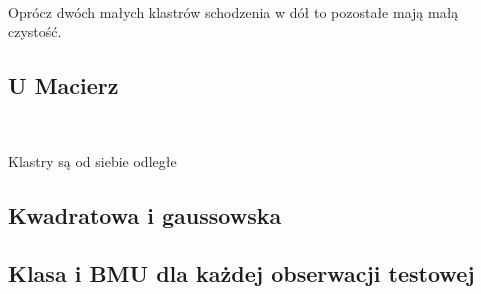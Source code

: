 \documentclass[11pt]{article}
\begin{document}
            
        
    \begin{center}
    \end{center}
    { \hspace*{\fill} \\}
    
    Oprócz dwóch małych klastrów schodzenia w dół to pozostałe mają małą
czystość.

    \hypertarget{u-macierz}{%
\subsection{U Macierz}\label{u-macierz}}

            
        
    \begin{center}
    \end{center}
    { \hspace*{\fill} \\}
    
    Klastry są od siebie odległe

    \hypertarget{kwadratowa-i-gaussowska}{%
\subsection{Kwadratowa i gaussowska}\label{kwadratowa-i-gaussowska}}

    \hypertarget{klasa-i-bmu-dla-kaux17cdej-obserwacji-testowej}{%
\subsection{Klasa i BMU dla każdej obserwacji
testowej}\label{klasa-i-bmu-dla-kaux17cdej-obserwacji-testowej}}

            
        
    \begin{center}
    \end{center}
    { \hspace*{\fill} \\}
    
\end{document}
